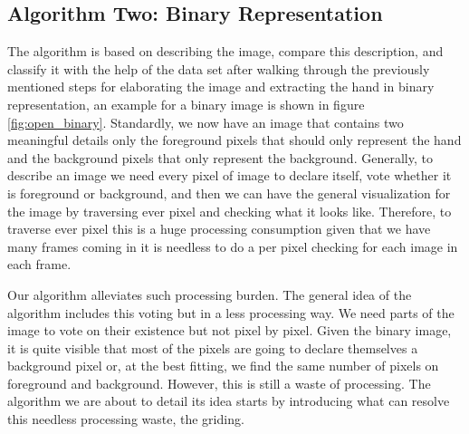 \documentclass[12pt,fleqn]{book} %
\begin{document}
\subsection{Algorithm Two: Binary Representation}
The algorithm is based on describing the image, compare this description, and classify it with the help of the data set after walking through the previously mentioned steps for elaborating the image and extracting the hand in binary representation, an example for a binary image is shown in figure \ref{fig:open_binary}. Standardly, we now have an image that contains two meaningful details only the foreground pixels that should only represent the hand and the background pixels that only represent the background. Generally, to describe an image we need every pixel of image to declare itself, vote whether it is foreground or background, and then we can have the general visualization for the image by traversing ever pixel and checking what it looks like. Therefore, to traverse ever pixel this is a huge processing consumption given that we have many frames coming in it is needless to do a per pixel checking for each image in each frame. \bigskip
\begin{figure}[h]
\end{figure}

Our algorithm alleviates such processing burden. The general idea of the algorithm includes this voting but in a less processing way. We need parts of the image to vote on their existence but not pixel by pixel. Given the binary image, it is quite visible that most of the pixels are going to declare themselves a background pixel or, at the best fitting, we find the same number of pixels on foreground and background. However, this is still a waste of processing. The algorithm we are about to detail its idea starts by introducing what can resolve this needless processing waste, the griding. \bigskip
\end{document}
